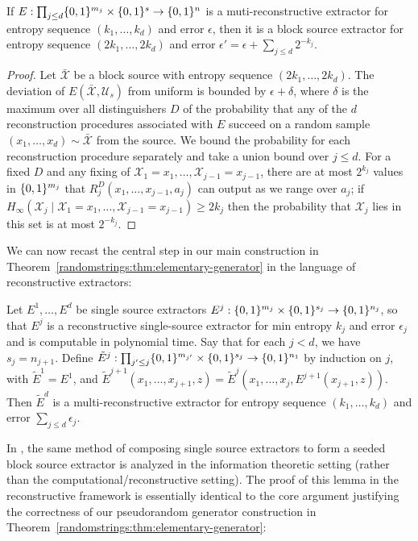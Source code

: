 \begin{lemma}\label{randomstrings:lem:recon-to-CG}
If $E: \prod_{j \leq d} \{0,1\}^{m_j} \times \{0,1\}^{s} \to \{0,1\}^n$ is a muti-reconstructive extractor for entropy sequence $(k_1,\ldots,k_d)$ and error $\epsilon$, then it is a block source extractor for entropy sequence $(2k_1,\ldots,2k_d)$ and error $\epsilon' = \epsilon + \sum_{j\leq d} 2^{-k_j}$.
\end{lemma}
\begin{proof}
Let $\bar{\mathcal{X}}$ be a block source with entropy sequence $(2k_1,\ldots,2k_d)$. The deviation of $E(\bar{\mathcal{X}}, \mathcal{U}_s)$ from uniform is bounded by $\epsilon + \delta$, where $\delta$ is the maximum over all distinguishers $D$ of the probability that any of the $d$ reconstruction procedures associated with $E$ succeed on a random sample $(x_1,\ldots,x_d) \sim \bar{\mathcal{X}}$ from the source. We bound the probability for each reconstruction procedure separately and take a union bound over $j \leq d$. For a fixed $D$ and any fixing of $\mathcal{X}_1 = x_1,\ldots,\mathcal{X}_{j-1} = x_{j-1}$, there are at most $2^{k_j}$ values in $\{0,1\}^{m_j}$ that $R_j^D(x_1,\ldots,x_{j-1},a_j)$ can output as we range over $a_j$; if $H_{\infty}(\mathcal{X}_j \mid \mathcal{X}_1 = x_1,\ldots,\mathcal{X}_{j-1} = x_{j-1}) \geq 2k_j$ then the probability that $\mathcal{X}_j$ lies in this set is at most $2^{-k_j}$.
\end{proof}
We can now recast the central step in our main construction in Theorem~\ref{randomstrings:thm:elementary-generator} in the language of reconstructive extractors:
\begin{theorem}
Let $E^1,\ldots,E^d$ be single source extractors $E^j: \{0,1\}^{m_j} \times \{0,1\}^{s_j} \to \{0,1\}^{n_j}$, so that $E^j$ is a reconstructive single-source extractor for min entropy $k_j$ and error $\epsilon_j$ and is computable in polynomial time. Say that for each $j < d$, we have $s_j = n_{j+1}$. Define $\tilde{E}^j: \prod_{j' \leq j} \{0,1\}^{m_{j'}} \times \{0,1\}^{s_j} \to \{0,1\}^{n_1}$ by induction on $j$, with $\tilde{E}^1 = E^1$, and $\tilde{E} ^{j+1}(x_1,\ldots,x_{j+1},z) = \tilde{E}^{j}(x_1,\ldots,x_{j}, E^{j+1}(x_{j+1}, z))$. Then $\tilde{E}^d$ is a multi-reconstructive extractor for entropy sequence $(k_1,\ldots,k_d)$ and error $\sum_{j \leq d} \epsilon_j$. 
\end{theorem}
In \cite{NZ}, the same method of composing single source extractors to form a seeded block source extractor is analyzed in the information theoretic setting (rather than the computational/reconstructive setting). The proof of this lemma in the reconstructive framework is essentially identical to the core argument justifying the correctness of our pseudorandom generator construction in Theorem~\ref{randomstrings:thm:elementary-generator}:

